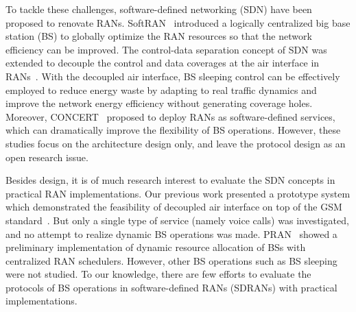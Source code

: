 \documentclass[conference]{IEEEtran}
\begin{document}
To tackle these challenges, software-defined networking (SDN) have
been proposed to renovate RANs.
SoftRAN~\cite{gudipati2013softran} introduced a logically centralized big base
station (BS) to globally optimize the RAN resources so that the
network efficiency can be improved.
The control-data separation concept of SDN was extended to decouple the control and
data coverages at the
air interface in RANs~\cite{niu2012energy,capone2012looking,ishii2012novel}.
With the decoupled air interface, BS sleeping control can be effectively employed to
reduce energy waste by adapting to real traffic dynamics and
improve the network energy efficiency without generating coverage holes.
Moreover, CONCERT~\cite{liu2014concert} proposed to deploy RANs as
software-defined services, which can dramatically improve the flexibility of
BS operations.
However, these studies focus on the architecture design only, and
leave the protocol design as an open research issue.

Besides design, it is of much research interest to evaluate the SDN concepts in
practical RAN
implementations.
Our previous work presented a prototype system
which demonstrated the feasibility of decoupled air interface on top of
the GSM standard~\cite{zhao2013software}.
But only a single type of service (namely voice calls) was investigated, and no
attempt to realize dynamic BS operations was made.
PRAN~\cite{wu2014pran} showed a preliminary implementation of dynamic resource
allocation of BSs with centralized RAN schedulers. However, other BS operations such as BS
sleeping were not studied.
To our knowledge, there are few efforts to evaluate the
protocols of BS operations in software-defined RANs (SDRANs) with practical
implementations.
\end{document}
